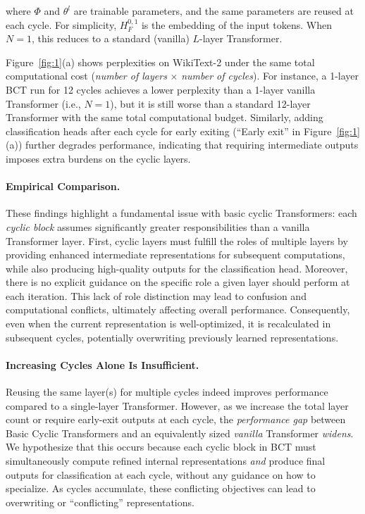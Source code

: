 where $\Phi$ and $\theta^l$ are trainable parameters, and the same parameters are reused at each cycle. For simplicity, $H_F^{0,1}$ is the embedding of the input tokens. When $N=1$, this reduces to a standard (vanilla) $L$-layer Transformer.

Figure~\ref{fig:1}(a) shows perplexities on WikiText-2 under the same total computational cost (\emph{number of layers} $\times$ \emph{number of cycles}). 
For instance, a 1-layer BCT run for 12 cycles achieves a lower perplexity than a 1-layer vanilla Transformer (i.e., $N=1$), but it is still worse than a standard 12-layer Transformer with the same total computational budget.
Similarly, adding classification heads after each cycle for early exiting (``Early exit'' in Figure~\ref{fig:1}(a)) further degrades performance, indicating that requiring intermediate outputs imposes extra burdens on the cyclic layers.

\paragraph{Empirical Comparison.}
These findings highlight a fundamental issue with basic cyclic Transformers:
each \emph{cyclic block} assumes significantly greater responsibilities than a vanilla Transformer layer. 
First, cyclic layers must fulfill the roles of multiple layers by providing enhanced intermediate representations for subsequent computations, while also producing high-quality outputs for the classification head.
Moreover, there is no explicit guidance on the specific role a given layer should perform at each iteration. 
This lack of role distinction may lead to confusion and computational conflicts, ultimately affecting overall performance. 
Consequently, even when the current representation is well-optimized, it is recalculated in subsequent cycles, potentially overwriting previously learned representations.

\paragraph{Increasing Cycles Alone Is Insufficient.}
Reusing the same layer(s) for multiple cycles indeed improves performance compared to a single-layer Transformer.
However, as we increase the total layer count or require early-exit outputs at each cycle, the \emph{performance gap} between Basic Cyclic Transformers and an equivalently sized \emph{vanilla} Transformer \emph{widens}.
We hypothesize that this occurs because each cyclic block in BCT must simultaneously compute refined internal representations \emph{and} produce final outputs for classification at each cycle, without any guidance on how to specialize. 
As cycles accumulate, these conflicting objectives can lead to overwriting or “conflicting” representations.


